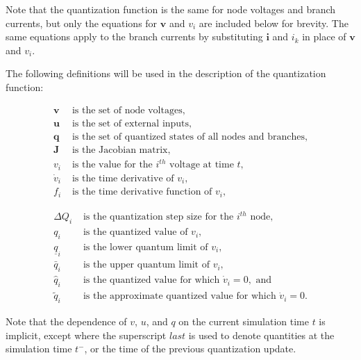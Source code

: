 Note that the quantization function is the same for node voltages and branch currents, but only the equations for $\mathbf{v}$ and $v_i$ are included below for brevity. The same equations apply to the branch currents by substituting $\mathbf{i}$ and $i_k$ in place of $\mathbf{v}$ and $v_i$.

The following definitions will be used in the description of the quantization function:

\begin{align*}
    \mathbf{v}      & \text{ is the set of node voltages}, \\
    \mathbf{u}      & \text{ is the set of external inputs}, \\
    \mathbf{q}      & \text{ is the set of quantized states of all nodes and branches}, \\
    \mathbf{J}      & \text{ is the Jacobian matrix}, \\
    v_i             & \text{ is the value for the } i^{th} \text{ voltage at time } t, \\
    \dot{v}_i       & \text{ is the time derivative of } v_i, \\
    f_i             & \text{ is the time derivative function of } v_i,
\end{align*}

\begin{align*}
    \Delta Q_i      & \text{ is the quantization step size for the } i^{th} \text{ node}, \\
    q_i             & \text{ is the quantized value of } v_i, \\
    \underline{q}_i & \text{ is the lower quantum limit of } v_i, \\
    \bar{q}_i       & \text{ is the upper quantum limit of } v_i, \\
    \hat{q}_i       & \text{ is the quantized value for which } \dot{v}_i=0, \text{ and} \\
    \tilde{q}_i     & \text{ is the approximate quantized value for which } \dot{v}_i=0.
\end{align*}

Note that the dependence of $v$, $u$, and $q$ on the current simulation time $t$ is implicit, except where the superscript $last$ is used to denote quantities at the simulation time $t^-$, or the time of the previous quantization update.

